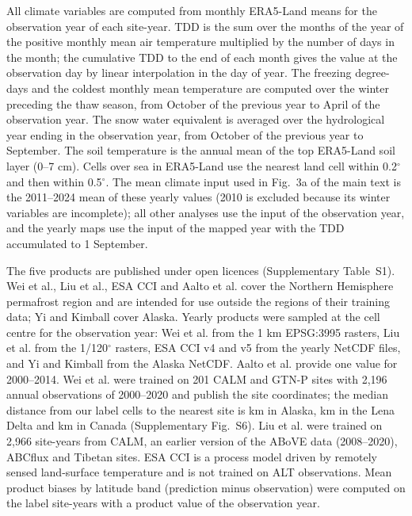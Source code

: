 \documentclass[pdflatex,sn-nature]{sn-jnl}
\begin{document}
All climate variables are computed from monthly ERA5-Land means for the observation year of each site-year. TDD is the sum over the months of the year of the positive monthly mean air temperature multiplied by the number of days in the month; the cumulative TDD to the end of each month gives the value at the observation day by linear interpolation in the day of year. The freezing degree-days and the coldest monthly mean temperature are computed over the winter preceding the thaw season, from October of the previous year to April of the observation year. The snow water equivalent is averaged over the hydrological year ending in the observation year, from October of the previous year to September. The soil temperature is the annual mean of the top ERA5-Land soil layer (0--7 cm). Cells over sea in ERA5-Land use the nearest land cell within 0.2$^\circ$ and then within 0.5$^\circ$. The mean climate input used in Fig.~3a of the main text is the 2011--2024 mean of these yearly values (2010 is excluded because its winter variables are incomplete); all other analyses use the input of the observation year, and the yearly maps use the input of the mapped year with the TDD accumulated to 1 September.

The five products are published under open licences (Supplementary Table~S1). Wei et al.\cite{Wei2026}, Liu et al.\cite{Liu2024}, ESA CCI\cite{Westermann2024,Westermann2025} and Aalto et al.\cite{Aalto2018} cover the Northern Hemisphere permafrost region and are intended for use outside the regions of their training data; Yi and Kimball\cite{YiKimball2019} cover Alaska. Yearly products were sampled at the cell centre for the observation year: Wei et al. from the 1 km EPSG:3995 rasters, Liu et al. from the 1/120$^\circ$ rasters, ESA CCI v4 and v5 from the yearly NetCDF files, and Yi and Kimball from the Alaska NetCDF. Aalto et al. provide one value for 2000--2014. Wei et al. were trained on 201 CALM and GTN-P sites with 2,196 annual observations of 2000--2020 and publish the site coordinates; the median distance from our label cells to the nearest site is \ndistweiAkmed{} km in Alaska, \ndistweiLemed{} km in the Lena Delta and \ndistweiCamed{} km in Canada (Supplementary Fig.~S6). Liu et al. were trained on 2,966 site-years from CALM, an earlier version of the ABoVE data (2008--2020), ABCflux and Tibetan sites. ESA CCI is a process model driven by remotely sensed land-surface temperature and is not trained on ALT observations. Mean product biases by latitude band (prediction minus observation) were computed on the label site-years with a product value of the observation year.
\end{document}
